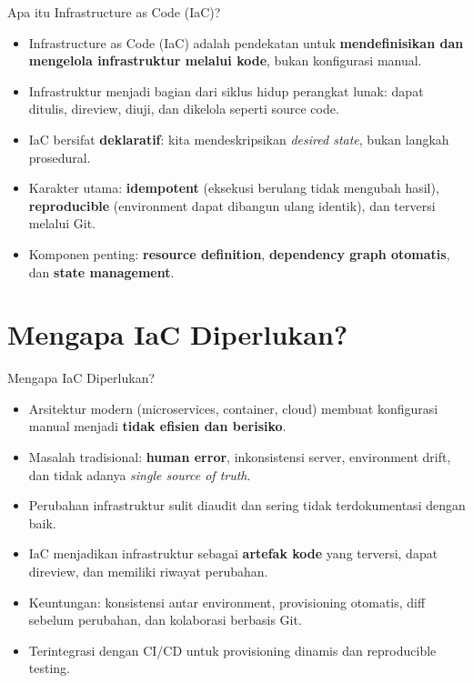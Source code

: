 \documentclass[aspectratio=169, table]{beamer}
\begin{document}
\begin{frame}{Apa itu Infrastructure as Code (IaC)?}
	\vspace{6pt}
	\begin{itemize}
		\item Infrastructure as Code (IaC) adalah pendekatan untuk \textbf{mendefinisikan dan mengelola infrastruktur melalui kode}, bukan konfigurasi manual.
		\item Infrastruktur menjadi bagian dari siklus hidup perangkat lunak: dapat ditulis, direview, diuji, dan dikelola seperti source code.
		\item IaC bersifat \textbf{deklaratif}: kita mendeskripsikan \textit{desired state}, bukan langkah prosedural.
		\item Karakter utama: \textbf{idempotent} (eksekusi berulang tidak mengubah hasil), \textbf{reproducible} (environment dapat dibangun ulang identik), dan terversi melalui Git.
		\item Komponen penting: \textbf{resource definition}, \textbf{dependency graph otomatis}, dan \textbf{state management}.
	\end{itemize}
\end{frame}

\section{Mengapa IaC Diperlukan?}

\begin{frame}{Mengapa IaC Diperlukan?}
	\vspace{6pt}
	\begin{itemize}
		\item Arsitektur modern (microservices, container, cloud) membuat konfigurasi manual menjadi \textbf{tidak efisien dan berisiko}.
		\item Masalah tradisional: \textbf{human error}, inkonsistensi server, environment drift, dan tidak adanya \textit{single source of truth}.
		\item Perubahan infrastruktur sulit diaudit dan sering tidak terdokumentasi dengan baik.
		\item IaC menjadikan infrastruktur sebagai \textbf{artefak kode} yang terversi, dapat direview, dan memiliki riwayat perubahan.
		\item Keuntungan: konsistensi antar environment, provisioning otomatis, diff sebelum perubahan, dan kolaborasi berbasis Git.
		\item Terintegrasi dengan CI/CD untuk provisioning dinamis dan reproducible testing.
	\end{itemize}
\end{frame}
\end{document}

